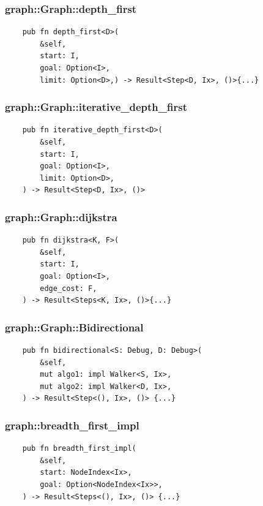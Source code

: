 \subsubsection{graph::Graph::depth\_first}
\begin{verbatim}
    pub fn depth_first<D>(
        &self,
        start: I, 
        goal: Option<I>,
        limit: Option<D>,) -> Result<Step<D, Ix>, ()>{...}
\end{verbatim}

\subsubsection{graph::Graph::iterative\_depth\_first}
\begin{verbatim}
    pub fn iterative_depth_first<D>(
        &self,
        start: I,
        goal: Option<I>,
        limit: Option<D>,
    ) -> Result<Step<D, Ix>, ()>
\end{verbatim}


\subsubsection{graph::Graph::dijkstra}
\begin{verbatim}
    pub fn dijkstra<K, F>(
        &self,
        start: I,
        goal: Option<I>,
        edge_cost: F,
    ) -> Result<Steps<K, Ix>, ()>{...}
\end{verbatim}


\subsubsection{graph::Graph::Bidirectional}
\begin{verbatim}
    pub fn bidirectional<S: Debug, D: Debug>(
        &self,
        mut algo1: impl Walker<S, Ix>,
        mut algo2: impl Walker<D, Ix>,
    ) -> Result<Step<(), Ix>, ()> {...}

\end{verbatim}

\subsubsection{graph::breadth\_first\_impl}
\begin{verbatim}
    pub fn breadth_first_impl(
        &self,
        start: NodeIndex<Ix>,
        goal: Option<NodeIndex<Ix>>,
    ) -> Result<Steps<(), Ix>, ()> {...}
\end{verbatim}

